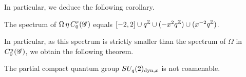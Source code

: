 In particular, we deduce the following corollary.

\begin{Cor} The spectrum of $\Omega \,\eta\, C^{r}_{0}(\mathscr{G})$ equals $\lbrack -2,2\rbrack \cup q^{\mathbb{Z}} \cup (-x^2q^{\mathbb{Z}})\cup (x^{-2}q^{\mathbb{Z}})$.
\end{Cor} 

In particular, as this spectrum is strictly smaller than the spectrum of $\Omega$ in $C^{u}_{0}(\mathscr{G})$, we obtain the following theorem.

\begin{Theorem} The partial compact quantum group $SU_q(2)_{\operatorname{\mathrm{dyn}},x}$ is not coamenable.
\end{Theorem} 




